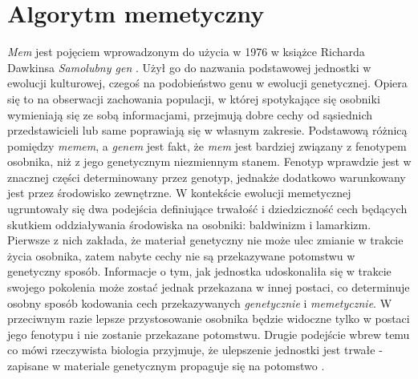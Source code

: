 \section{Algorytm memetyczny}
%
\par
\emph{Mem} jest pojęciem wprowadzonym do użycia w 1976 w książce Richarda Dawkinsa \emph{Samolubny gen} \cite{dawkins2011}. Użył go do nazwania podstawowej jednostki w ewolucji kulturowej, czegoś na podobieństwo genu w ewolucji genetycznej. Opiera się to na obserwacji zachowania populacji, w której spotykające się osobniki wymieniają się ze sobą informacjami, przejmują dobre cechy od sąsiednich przedstawicieli lub same poprawiają się w własnym zakresie. Podstawową różnicą pomiędzy \emph{memem}, a \emph{genem} jest fakt, że \emph{mem} jest bardziej związany z fenotypem osobnika, niż z jego genetycznym niezmiennym stanem. Fenotyp wprawdzie jest w znacznej części determinowany przez genotyp, jednakże dodatkowo warunkowany jest przez środowisko zewnętrzne. W kontekście ewolucji memetycznej ugruntowały się dwa podejścia definiujące trwałość i dziedziczność cech będących skutkiem oddziaływania środowiska na osobniki: baldwinizm i lamarkizm. Pierwsze z nich zakłada, że materiał genetyczny nie może ulec zmianie w trakcie życia osobnika, zatem nabyte cechy nie są przekazywane potomstwu w genetyczny sposób. Informacje o tym, jak jednostka udoskonaliła się w trakcie swojego pokolenia może zostać jednak przekazana w innej postaci, co determinuje osobny sposób kodowania cech przekazywanych \emph{genetycznie} i \emph{memetycznie}. W przeciwnym razie lepsze przystosowanie osobnika będzie widoczne tylko w postaci jego fenotypu i nie zostanie przekazane potomstwu. Drugie podejście wbrew temu co mówi rzeczywista biologia przyjmuje, że ulepszenie jednostki jest trwałe - zapisane w materiale genetycznym propaguje się na potomstwo \cite{whitley1994lamarckian}.
\par
